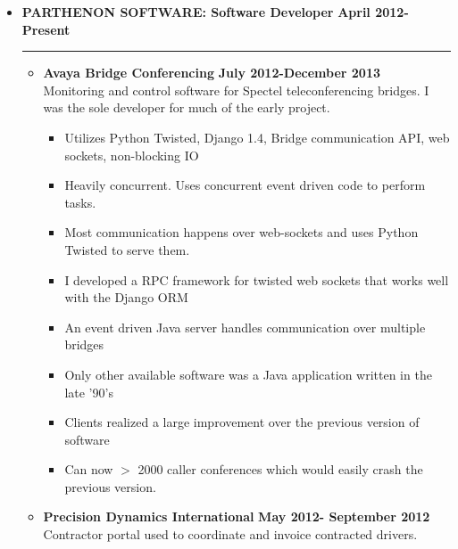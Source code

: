 \documentclass[overlapped]{res}
\begin{document}
\begin{resume}
\begin{itemize}[leftmargin=0in]
    \pagebreak
    \item[] 
        \textbf{PARTHENON SOFTWARE: Software Developer} \hfill \textbf{April 2012-Present} \\[-0.1in] \rule{\textwidth}{0.5pt}
        \begin{itemize}[leftmargin=0in]
            \item[] 
                \begin{samepage}
                    \textbf{Avaya Bridge Conferencing} \hfill \textbf{July 2012-December 2013} \\
                    Monitoring and control software for Spectel teleconferencing bridges. I was the sole developer for much of the early project.
                    \begin{itemize}
                        \item[\textbullet] Utilizes Python Twisted, Django 1.4, Bridge communication API, web sockets, non-blocking IO
                        \item[\textbullet] Heavily concurrent. Uses concurrent event driven code to perform tasks.
                        \item[\textbullet] Most communication happens over web-sockets and uses Python Twisted to serve them.
                        \item[\textbullet] I developed a RPC framework for twisted web sockets that works well with the Django ORM
                        \item[\textbullet] An event driven Java server handles communication over multiple bridges
                        \item[\textbullet] Only other available software was a Java application written in the late '90's
                        \item[\textbullet] Clients realized a large improvement over the previous version of software
                        \item[\textbullet] Can now $>$ 2000 caller conferences which would easily crash the previous version.
                    \end{itemize}
                \end{samepage}
            \item[]
                \begin{samepage}
                    \textbf{Precision Dynamics International} \hfill \textbf{May 2012- September 2012} \\
                    Contractor portal used to coordinate and invoice contracted drivers.

\end{samepage}
\end{itemize}
\end{itemize}
\end{resume}
\end{document}
